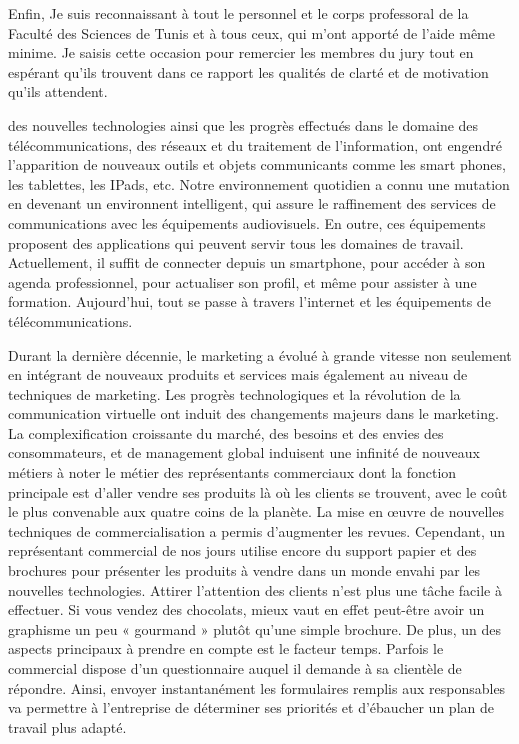 \documentclass[12pt, ChapStyle1, oneside]{./Styles/Dea_Gsm}
\begin{document}
\vspace{4mm}
Enfin, Je suis reconnaissant à tout le personnel et le corps professoral de la Faculté des Sciences de Tunis et à tous ceux, qui m'ont apporté de l'aide même minime. Je saisis cette occasion pour remercier les membres du jury tout en espérant qu'ils trouvent dans ce rapport les qualités de clarté et de motivation qu'ils attendent.
\tableofcontents
\pagebreak
\listoffigures
\pagebreak
{}
\setcounter{page}{1}
\vspace{5mm}
 des nouvelles technologies ainsi que les progrès effectués dans le domaine des télécommunications, des réseaux et du traitement de l’information, ont engendré l’apparition de nouveaux outils et objets communicants comme les smart phones, les tablettes, les IPads, etc. 
Notre environnement quotidien a connu une mutation en devenant un environnent intelligent, qui assure le raffinement des services de communications avec les équipements audiovisuels. En outre, ces équipements proposent des applications qui peuvent servir tous les domaines de travail. Actuellement, il suffit de connecter depuis un smartphone, pour accéder à son agenda professionnel, pour actualiser son profil, et même pour assister à une formation. Aujourd’hui, tout se passe à travers l’internet et les équipements de télécommunications. 


Durant la dernière décennie, le marketing a évolué à grande vitesse non seulement en intégrant de nouveaux produits et services mais également au niveau de techniques de marketing. Les progrès technologiques et la révolution de la communication virtuelle ont induit des changements majeurs dans le marketing. La complexification croissante du marché, des besoins et des envies des consommateurs, et de management global induisent une infinité de nouveaux métiers à noter le métier des représentants commerciaux dont la fonction principale est d’aller vendre ses produits là où les clients se trouvent, avec le coût le plus convenable aux quatre coins de la planète.
La mise en œuvre de nouvelles techniques de commercialisation a permis d’augmenter les revues.  Cependant, un représentant commercial de nos jours utilise encore du support papier et des brochures pour présenter les produits à vendre dans un monde envahi par les nouvelles technologies. Attirer l’attention des clients n’est plus une tâche facile à effectuer. Si vous vendez des chocolats, mieux vaut en effet peut-être avoir un graphisme un peu « gourmand » plutôt qu’une simple brochure. De plus, un des aspects principaux à prendre en compte est le facteur temps. Parfois le commercial dispose d’un questionnaire auquel il demande à sa clientèle de répondre. Ainsi, envoyer instantanément les formulaires remplis aux responsables va permettre à l’entreprise de déterminer ses priorités et d’ébaucher un plan de travail plus adapté.
\end{document}
